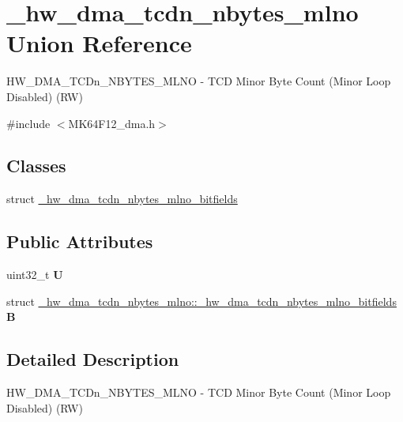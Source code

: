 \hypertarget{union__hw__dma__tcdn__nbytes__mlno}{}\section{\+\_\+hw\+\_\+dma\+\_\+tcdn\+\_\+nbytes\+\_\+mlno Union Reference}
\label{union__hw__dma__tcdn__nbytes__mlno}


H\+W\+\_\+\+D\+M\+A\+\_\+\+T\+C\+Dn\+\_\+\+N\+B\+Y\+T\+E\+S\+\_\+\+M\+L\+NO -\/ T\+CD Minor Byte Count (Minor Loop Disabled) (RW)  




{\ttfamily \#include $<$M\+K64\+F12\+\_\+dma.\+h$>$}

\subsection*{Classes}
\begin{DoxyCompactItemize}
\item 
struct \hyperlink{struct__hw__dma__tcdn__nbytes__mlno_1_1__hw__dma__tcdn__nbytes__mlno__bitfields}{\+\_\+hw\+\_\+dma\+\_\+tcdn\+\_\+nbytes\+\_\+mlno\+\_\+bitfields}
\end{DoxyCompactItemize}
\subsection*{Public Attributes}
\begin{DoxyCompactItemize}
\item 
uint32\+\_\+t {\bfseries U}\hypertarget{union__hw__dma__tcdn__nbytes__mlno_af324ef4aa697484fe72f103ee6d035c9}{}\label{union__hw__dma__tcdn__nbytes__mlno_af324ef4aa697484fe72f103ee6d035c9}

\item 
struct \hyperlink{struct__hw__dma__tcdn__nbytes__mlno_1_1__hw__dma__tcdn__nbytes__mlno__bitfields}{\+\_\+hw\+\_\+dma\+\_\+tcdn\+\_\+nbytes\+\_\+mlno\+::\+\_\+hw\+\_\+dma\+\_\+tcdn\+\_\+nbytes\+\_\+mlno\+\_\+bitfields} {\bfseries B}\hypertarget{union__hw__dma__tcdn__nbytes__mlno_abf46f85c6ff96ea93e9dd18d4d4b2b6f}{}\label{union__hw__dma__tcdn__nbytes__mlno_abf46f85c6ff96ea93e9dd18d4d4b2b6f}

\end{DoxyCompactItemize}


\subsection{Detailed Description}
H\+W\+\_\+\+D\+M\+A\+\_\+\+T\+C\+Dn\+\_\+\+N\+B\+Y\+T\+E\+S\+\_\+\+M\+L\+NO -\/ T\+CD Minor Byte Count (Minor Loop Disabled) (RW) 

